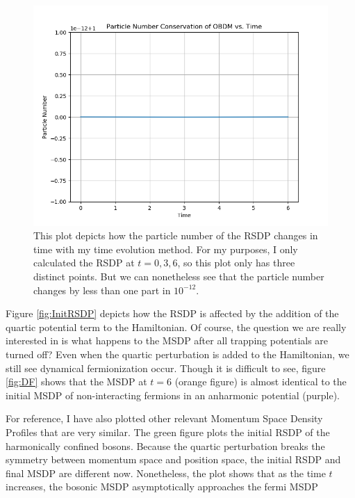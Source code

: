 \documentclass[onecolumn,english,aps,pra]{revtex4}
\begin{document}
\begin{figure}[h]
\center
\includegraphics[scale=0.7]{../Plots/Anharmonic/ParticleConservation}
\caption{This plot depicts how the particle number of the RSDP changes in time with my time evolution method. For my purposes, I only calculated the RSDP at $t = 0, 3, 6$, so this plot only has three distinct points. But we can nonetheless see that the particle number changes by less than one part in $10^{-12}$.}
\label{fig:ParticleConservation}
\end{figure}

Figure \ref{fig:InitRSDP} depicts how the RSDP is affected by the addition of the quartic potential term to the Hamiltonian. Of course, the question we are really interested in is what happens to the MSDP after all trapping potentials are turned off? Even when the quartic perturbation is added to the Hamiltonian, we still see dynamical fermionization occur. Though it is difficult to see, figure \ref{fig:DF} shows that the MSDP at $t=6$ (orange figure) is almost identical to the initial MSDP of non-interacting fermions in an anharmonic potential (purple). 

For reference, I have also plotted other relevant Momentum Space Density Profiles that are very similar. The green figure plots the initial RSDP of the harmonically confined bosons. Because the quartic perturbation breaks the symmetry between momentum space and position space, the initial RSDP and final MSDP are different now. Nonetheless, the plot shows that as the time $t$ increases, the bosonic MSDP asymptotically approaches the fermi MSDP
\end{document}

